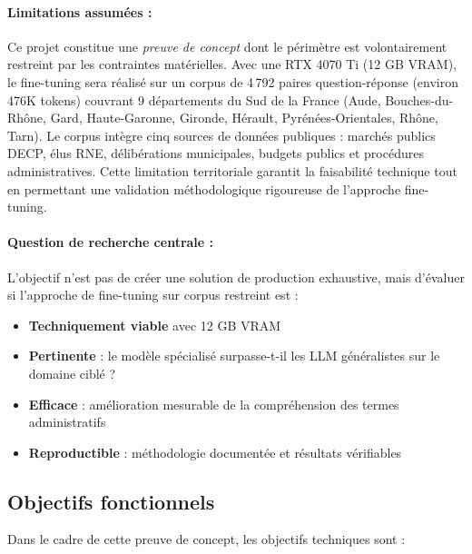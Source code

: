 \paragraph{Limitations assumées :} Ce projet constitue une \textit{preuve de concept} dont le périmètre est volontairement restreint par les contraintes matérielles. Avec une RTX 4070 Ti (12 GB VRAM), le fine-tuning sera réalisé sur un corpus de 4\,792 paires question-réponse (environ 476K tokens) couvrant 9 départements du Sud de la France (Aude, Bouches-du-Rhône, Gard, Haute-Garonne, Gironde, Hérault, Pyrénées-Orientales, Rhône, Tarn). Le corpus intègre cinq sources de données publiques : marchés publics DECP, élus RNE, délibérations municipales, budgets publics et procédures administratives. Cette limitation territoriale garantit la faisabilité technique tout en permettant une validation méthodologique rigoureuse de l'approche fine-tuning.

\paragraph{Question de recherche centrale :} L'objectif n'est pas de créer une solution de production exhaustive, mais d'évaluer si l'approche de fine-tuning sur corpus restreint est :
\begin{itemize}
    \item \textbf{Techniquement viable} avec 12 GB VRAM
    \item \textbf{Pertinente} : le modèle spécialisé surpasse-t-il les LLM généralistes sur le domaine ciblé ?
    \item \textbf{Efficace} : amélioration mesurable de la compréhension des termes administratifs
    \item \textbf{Reproductible} : méthodologie documentée et résultats vérifiables
\end{itemize}

\subsection{Objectifs fonctionnels}

Dans le cadre de cette preuve de concept, les objectifs techniques sont :

